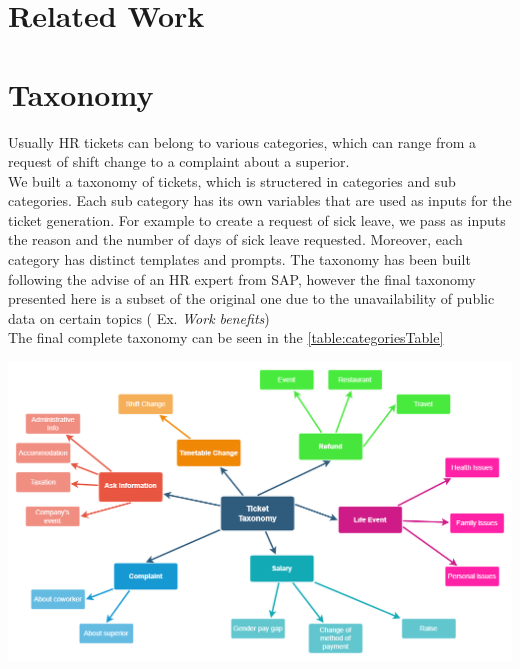 \documentclass{article}
\begin{document}
\section{Related Work}

\section{Taxonomy}
Usually HR tickets can belong to various categories, which can range from a request of shift change to a complaint about a superior. \\
We built a taxonomy of tickets, which is structered in categories and sub categories. Each sub category has its own variables that are used as inputs for the ticket generation. For example to create a request of sick leave, we pass as inputs the reason and the number of days of sick leave requested. Moreover, each category has distinct templates and prompts. The taxonomy has been built following the advise of an HR expert from SAP, however the final taxonomy presented here is a subset of the original one due to the unavailability of public data on certain topics ( Ex. \textit{Work benefits})  \\
The final complete taxonomy can be seen in the \autoref{table:categoriesTable}

\includegraphics[width=\textwidth]{Taxonomy_Tickets.drawio}
\end{document}
